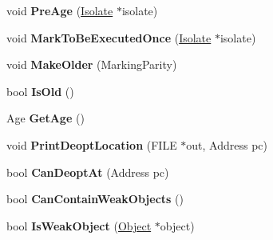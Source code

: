 \begin{DoxyCompactItemize}
\item 
void {\bfseries Pre\+Age} (\hyperlink{classv8_1_1internal_1_1_isolate}{Isolate} $\ast$isolate)\hypertarget{classv8_1_1internal_1_1_code_af4795207021ed2f1e08608760437c6bb}{}\label{classv8_1_1internal_1_1_code_af4795207021ed2f1e08608760437c6bb}

\item 
void {\bfseries Mark\+To\+Be\+Executed\+Once} (\hyperlink{classv8_1_1internal_1_1_isolate}{Isolate} $\ast$isolate)\hypertarget{classv8_1_1internal_1_1_code_a58bcbdb76e8cf981be2dd95e077aa665}{}\label{classv8_1_1internal_1_1_code_a58bcbdb76e8cf981be2dd95e077aa665}

\item 
void {\bfseries Make\+Older} (Marking\+Parity)\hypertarget{classv8_1_1internal_1_1_code_ad2d4b186e030ab198fff770927e8b9e4}{}\label{classv8_1_1internal_1_1_code_ad2d4b186e030ab198fff770927e8b9e4}

\item 
bool {\bfseries Is\+Old} ()\hypertarget{classv8_1_1internal_1_1_code_a296aa0b99e4fc0d279fbd4a5a78f63d7}{}\label{classv8_1_1internal_1_1_code_a296aa0b99e4fc0d279fbd4a5a78f63d7}

\item 
Age {\bfseries Get\+Age} ()\hypertarget{classv8_1_1internal_1_1_code_ab94cecb2c3cd1b3de780ea9c8d2d0606}{}\label{classv8_1_1internal_1_1_code_ab94cecb2c3cd1b3de780ea9c8d2d0606}

\item 
void {\bfseries Print\+Deopt\+Location} (F\+I\+LE $\ast$out, Address pc)\hypertarget{classv8_1_1internal_1_1_code_a6b6e0b218021e877ee829fdaf039e576}{}\label{classv8_1_1internal_1_1_code_a6b6e0b218021e877ee829fdaf039e576}

\item 
bool {\bfseries Can\+Deopt\+At} (Address pc)\hypertarget{classv8_1_1internal_1_1_code_a9fec9635426df94d27beabb15ab45dd6}{}\label{classv8_1_1internal_1_1_code_a9fec9635426df94d27beabb15ab45dd6}

\item 
bool {\bfseries Can\+Contain\+Weak\+Objects} ()\hypertarget{classv8_1_1internal_1_1_code_a11b116ebb4cbb076b68a27c5c28ec997}{}\label{classv8_1_1internal_1_1_code_a11b116ebb4cbb076b68a27c5c28ec997}

\item 
bool {\bfseries Is\+Weak\+Object} (\hyperlink{classv8_1_1internal_1_1_object}{Object} $\ast$object)\hypertarget{classv8_1_1internal_1_1_code_aae581c0f6d5931987c3f35850d7ba08e}{}\label{classv8_1_1internal_1_1_code_aae581c0f6d5931987c3f35850d7ba08e}


\end{DoxyCompactItemize}
